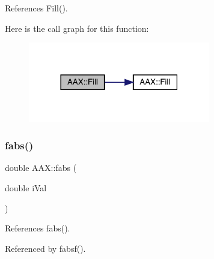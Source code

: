References Fill().

Here is the call graph for this function\+:
\nopagebreak
\begin{figure}[H]
\begin{center}
\leavevmode
\includegraphics[width=225pt]{a00852_a114e6f06cf5789da4aad7ae0d786876e_cgraph}
\end{center}
\end{figure}
\mbox{\label{a00852_aa4fa4d0765a764b020102cdbff8b45b0}} 
\subsubsection{\texorpdfstring{fabs()}{fabs()}\hspace{0.1cm}{\footnotesize\ttfamily [1/2]}}
{\footnotesize\ttfamily double A\+A\+X\+::fabs (\begin{DoxyParamCaption}\item[{double}]{i\+Val }\end{DoxyParamCaption})\hspace{0.3cm}{\ttfamily [inline]}}



References fabs().



Referenced by fabsf().

